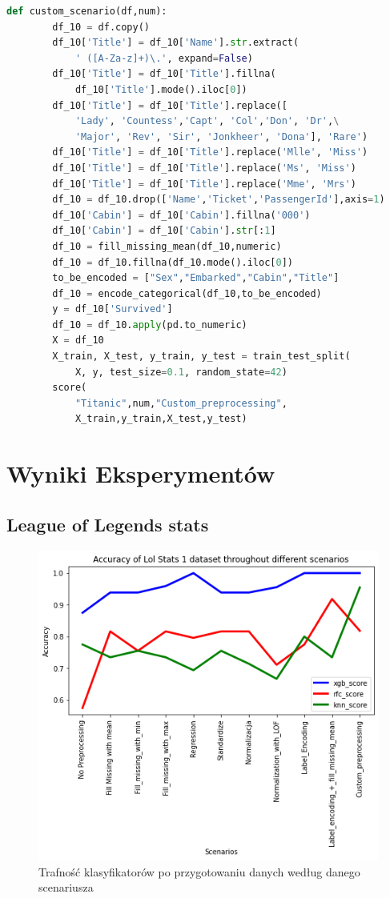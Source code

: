 \documentclass{article}
\begin{document}
\begin{lstlisting}[language=Python, caption={Usuwanie wartości odstających}, captionpos=b]
    def custom_scenario(df,num):
        df_10 = df.copy()
        df_10['Title'] = df_10['Name'].str.extract(
            ' ([A-Za-z]+)\.', expand=False)
        df_10['Title'] = df_10['Title'].fillna(
            df_10['Title'].mode().iloc[0])
        df_10['Title'] = df_10['Title'].replace([
            'Lady', 'Countess','Capt', 'Col','Don', 'Dr',\
            'Major', 'Rev', 'Sir', 'Jonkheer', 'Dona'], 'Rare')
        df_10['Title'] = df_10['Title'].replace('Mlle', 'Miss')
        df_10['Title'] = df_10['Title'].replace('Ms', 'Miss')
        df_10['Title'] = df_10['Title'].replace('Mme', 'Mrs')
        df_10 = df_10.drop(['Name','Ticket','PassengerId'],axis=1)
        df_10['Cabin'] = df_10['Cabin'].fillna('000')
        df_10['Cabin'] = df_10['Cabin'].str[:1]
        df_10 = fill_missing_mean(df_10,numeric)
        df_10 = df_10.fillna(df_10.mode().iloc[0])
        to_be_encoded = ["Sex","Embarked","Cabin","Title"]
        df_10 = encode_categorical(df_10,to_be_encoded)
        y = df_10['Survived']
        df_10 = df_10.apply(pd.to_numeric)
        X = df_10
        X_train, X_test, y_train, y_test = train_test_split(
            X, y, test_size=0.1, random_state=42)
        score(
            "Titanic",num,"Custom_preprocessing",
            X_train,y_train,X_test,y_test)
\end{lstlisting}

\section{Wyniki Eksperymentów}
\subsection{League of Legends stats}
\begin{figure}[H]
\centerline{\includegraphics{Lol_Stats_1}}
\centering
\caption{Trafność klasyfikatorów po przygotowaniu danych według danego scenariusza}

\end{figure}
\end{document}
